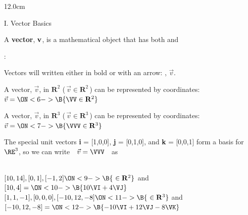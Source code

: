 \begin{frame}
\frametitle{}
\begin{columns}
\begin{column}{12.0cm}

{I. Vector Basics}

\vspace{0.2cm}

\scriptsize

\DEF A {\bf vector}, ${\bf v}$, is a mathematical object that has both  and 

\vspace{0.5cm}

: \\

\vspace{0.2cm}

\OBUL  Vectors will written either in bold or with an arrow: , $\vec{v}$.\\

\vspace{0.2cm}

\OBUL  A vector, $\vec{v}$, in $\mathbf{R}^2$ (\,$\vec{v} \in \mathbf{R}^2$\,) can be represented by  coordinates: \quad $\vec{v} = \ON<6->{\B{\VV \in \mathbf{R}^2}}$\\

\vspace{0.2cm}

\OBUL  A vector, $\vec{v}$, in $\mathbf{R}^3$ (\,$\vec{v} \in \mathbf{R}^3$\,) can be represented by  coordinates: \quad $\vec{v} = \ON<7->{\B{\VVV \in \mathbf{R}^3}}$\\

\vspace{0.2cm}

\OBUL  The special unit vectors {\bf i} = [1,0,0], {\bf j} = [0,1,0], and {\bf k} = [0,0,1] form a basis for $\RE^3$, \NEWLINE so we can write \,\, $\vec{v} = \VVV$ \,\, as \,\, 

\vspace{0.5cm}

\EX \\
\vspace{0.1cm}
\OBUL $[10,14], [0,1], [-1,2] \ON<9->{\B{\,\, \in \mathbf{R}^2}}$ \quad and \quad $[10,4] = \ON<10->{\B{10\VI + 4 \VJ}}$\\
\vspace{0.2cm}
\OBUL $[1,1,-1], [0,0,0], [-10,12,-8] \ON<11->{\B{\,\, \in \mathbf{R}^3}}$ \quad and \quad $[-10,12,-8] = \ON<12->{\B{-10\VI + 12 \VJ - 8\VK}}$\\


\end{column}
\end{columns}
\end{frame}
